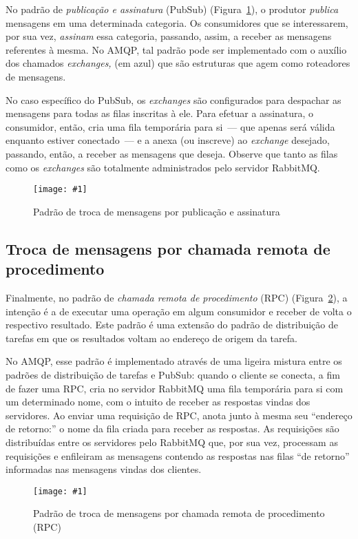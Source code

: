 \documentclass[ruledheader, 12pt]{abnt}
\newcommand{\figcustom}[4]{\par
	\begin{figure}[#3]
		\centering
		\texttt{[image: \#1]}
		\caption{\label{fig:#1}#2}
	\end{figure}
\par}
\newcommand{\fig}[2]{\figcustom{#1}{#2}{bp}{1}}
\newcommand{\figref}[1]{(Figura~\ref{fig:#1})}
\begin{document}
No padrão de \emph{publicação e assinatura} (PubSub) \figref{rabbitmq-pubsub}, o produtor \emph{publica} mensagens em uma determinada categoria. Os consumidores que se interessarem, por sua vez, \emph{assinam} essa categoria, passando, assim, a receber as mensagens referentes à mesma. No AMQP, tal padrão pode ser implementado com o auxílio dos chamados \emph{exchanges,} (em azul) que são estruturas que agem como roteadores de mensagens.

No caso específico do PubSub, os \emph{exchanges} são configurados para despachar as mensagens para todas as filas inscritas à ele. Para efetuar a assinatura, o consumidor, então, cria uma fila temporária para si~--- que apenas será válida enquanto estiver conectado~--- e a anexa (ou inscreve) ao \emph{exchange} desejado, passando, então, a receber as mensagens que deseja. Observe que tanto as filas como os \emph{exchanges} são totalmente administrados pelo servidor RabbitMQ.

\fig{rabbitmq-pubsub}{Padrão de troca de mensagens por publicação e assinatura}

\subsection{Troca de mensagens por chamada remota de procedimento}


Finalmente, no padrão de \emph{chamada remota de procedimento} (RPC) \figref{rabbitmq-rpc}, a intenção é a de executar uma operação em algum consumidor e receber de volta o respectivo resultado. Este padrão é uma extensão do padrão de distribuição de tarefas em que os resultados voltam ao endereço de origem da tarefa.

No AMQP, esse padrão é implementado através de uma ligeira mistura entre os padrões de distribuição de tarefas e PubSub: quando o cliente se conecta, a fim de fazer uma RPC, cria no servidor RabbitMQ uma fila temporária para si com um determinado nome, com o intuito de receber as respostas vindas dos servidores. Ao enviar uma requisição de RPC, anota junto à mesma seu ``endereço de retorno:'' o nome da fila criada para receber as respostas. As requisições são distribuídas entre os servidores pelo RabbitMQ que, por sua vez, processam as requisições e enfileiram as mensagens contendo as respostas nas filas ``de retorno'' informadas nas mensagens vindas dos clientes.

\figcustom{rabbitmq-rpc}{Padrão de troca de mensagens por chamada remota de procedimento (RPC)}{p}{1}
\end{document}

